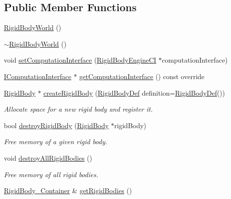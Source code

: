 \subsection*{Public Member Functions}
\begin{DoxyCompactItemize}
\item 
\mbox{\hyperlink{classr3_1_1_rigid_body_world_ae9358def6c2b1ea21d38059242fec505}{Rigid\+Body\+World}} ()
\item 
\mbox{\hyperlink{classr3_1_1_rigid_body_world_add6c229831a203d61ee8f5e2294b4192}{$\sim$\+Rigid\+Body\+World}} ()
\item 
void \mbox{\hyperlink{classr3_1_1_rigid_body_world_a0c5724007917231ebe9bd970d65b0bfe}{set\+Computation\+Interface}} (\mbox{\hyperlink{classr3_1_1_rigid_body_engine_c_i}{Rigid\+Body\+Engine\+CI}} $\ast$computation\+Interface)
\item 
\mbox{\hyperlink{classr3_1_1_i_computation_interface}{I\+Computation\+Interface}} $\ast$ \mbox{\hyperlink{classr3_1_1_rigid_body_world_ac25b39a5b15666d99f42b68f29f8a97b}{get\+Computation\+Interface}} () const override
\item 
\mbox{\hyperlink{classr3_1_1_rigid_body}{Rigid\+Body}} $\ast$ \mbox{\hyperlink{classr3_1_1_rigid_body_world_a647ca787c02a56c230eb5d50080b561d}{create\+Rigid\+Body}} (\mbox{\hyperlink{structr3_1_1_rigid_body_def}{Rigid\+Body\+Def}} definition=\mbox{\hyperlink{structr3_1_1_rigid_body_def}{Rigid\+Body\+Def}}())
\begin{DoxyCompactList}\small\item\em Allocate space for a new rigid body and register it. \end{DoxyCompactList}\item 
bool \mbox{\hyperlink{classr3_1_1_rigid_body_world_a1a203fb9675eba999e0f59c23e597111}{destroy\+Rigid\+Body}} (\mbox{\hyperlink{classr3_1_1_rigid_body}{Rigid\+Body}} $\ast$rigid\+Body)
\begin{DoxyCompactList}\small\item\em Free memory of a given rigid body. \end{DoxyCompactList}\item 
void \mbox{\hyperlink{classr3_1_1_rigid_body_world_acdfd6a392a98366cd8414f7f6f50917f}{destroy\+All\+Rigid\+Bodies}} ()
\begin{DoxyCompactList}\small\item\em Free memory of all rigid bodies. \end{DoxyCompactList}\item 
\mbox{\hyperlink{classr3_1_1_rigid_body_world_abe8c123eee198b6f8eca079e71302bcb}{Rigid\+Body\+\_\+\+Container}} \& \mbox{\hyperlink{classr3_1_1_rigid_body_world_a31e9a0ddd26c25327aa21b3460c52893}{get\+Rigid\+Bodies}} ()

\end{DoxyCompactItemize}
